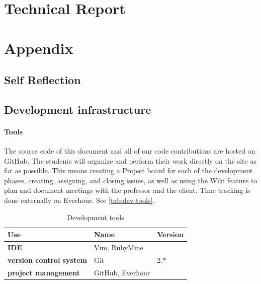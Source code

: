\documentclass[a4paper]{report}
\begin{document}
\part{Technical Report}






\printbibliography
\printglossaries

\appendix
\part{Appendix}
\chapter{Self Reflection}


\chapter{Development infrastructure}


\subsection{Tools}
The source code of this document and all of our code contributions are hosted
on GitHub. The students will organize and perform their work directly on the
site as far as possible. This means creating a Project board for each of the
development phases, creating, assigning, and closing issues, as well as using
the Wiki feature to plan and document meetings with the professor and the
client. Time tracking is done externally on Everhour. See
\autoref{tab:dev-tools}.


\begin{table}[H]
  \centering
  \scriptsize
  \begin{tabular}{|p{50mm}|p{15mm}|p{15mm}|}
    \hline 	\bf Use & Name & Version \\ \hline
	\bf IDE & Vim, RubyMine &  \\ \hline
	\bf version control system & Git & 2.* \\ \hline
	\bf project management  & GitHub, Everhour &  \\ \hline
  \end{tabular} \\
  \caption{Development tools}
  \label{tab:dev-tools}
\end{table}
\end{document}
